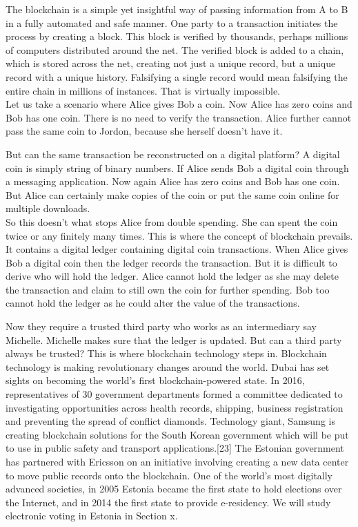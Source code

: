 \documentclass{report}
\begin{document}
The blockchain is a simple yet insightful way of passing information from A to B in a fully automated and safe manner. One party to a transaction initiates the process by creating a block. This block is verified by thousands, perhaps millions of computers distributed around the net. The verified block is added to a chain, which is stored across the net, creating not just a unique record, but a unique record with a unique history. Falsifying a single record would mean falsifying the entire chain in millions of instances. That is virtually impossible. \\
Let us take a scenario \cite{WinNT23} where Alice gives Bob a coin. Now Alice has zero coins and Bob has one coin. There is no need to verify the transaction. Alice further cannot pass the same coin to Jordon, because she herself doesn't have it.

But can the same transaction be reconstructed on a digital platform?  A digital coin is simply string of binary numbers. If Alice sends Bob a digital coin through a messaging application. Now again Alice has zero coins and Bob has one coin. But Alice can certainly make copies of the coin or put the same coin online for multiple downloads. \\
So this doesn't what stops Alice from double spending. She can spent the coin twice or any finitely many times.
This is where the concept of blockchain prevails. It contains a digital ledger containing digital coin transactions. When Alice gives Bob a digital coin then the ledger records the transaction. 
But it is difficult to derive who will hold the ledger. Alice cannot hold the ledger as she may delete the transaction and claim to still own the coin for further spending. Bob too cannot hold the ledger as he could alter the value of the transactions.\cite{WinNT24}

Now they require a trusted third party who works as an intermediary say Michelle. Michelle makes sure that the ledger is updated. But can a third party always be trusted?
This is where blockchain technology steps in.
Blockchain technology is making revolutionary changes around the world. Dubai has set sights on becoming the world's first blockchain-powered state. In 2016, representatives of 30 government departments formed a committee dedicated to investigating opportunities across health records, shipping, business registration and preventing the spread of conflict diamonds. Technology giant, Samsung is creating blockchain solutions for the South Korean government which will be put to use in public safety and transport applications.[23]  The Estonian government has partnered with Ericsson on an initiative involving creating a new data center to move public records onto the blockchain. One of the world's most digitally advanced societies, in 2005 Estonia became the first state to hold elections over the Internet, and in 2014 the first state to provide e-residency. We will study electronic voting in Estonia in Section x.
\end{document}
